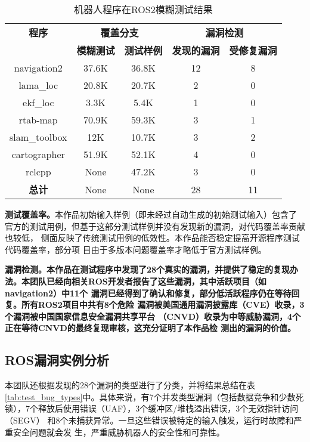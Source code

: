 \begin{table}[H]
	\small
	\caption{机器人程序在ROS2模糊测试结果}
  \label{tab:test_result}
	\centering
	\begin{tabular}{ccccc}
		\hline
		\textbf{程序} & \multicolumn{2}{c}{\textbf{覆盖分支}} & \multicolumn{2}{c}{\textbf{漏洞检测}} \\
		\cline{2-5}
		& \textbf{模糊测试} & \textbf{测试样例} & \textbf{发现的漏洞} & \textbf{受修复漏洞} \\
		\hline
		navigation2 & 37.6K & 36.8K & 12 & 8 \\
		lama\_loc & 20.8K & 20.7K & 2 & 0 \\
		ekf\_loc & 3.3K & 5.4K & 1 & 0 \\
		rtab-map & 70.9K & 59.3K & 3 & 1 \\
		slam\_toolbox & 12K & 10.7K & 3 & 2 \\
		cartographer & 51.9K & 52.1K & 4 & 0  \\
    rclcpp & None & 47.2K & 3 & 0 \\
		\textbf{总计} & None & None & 28 & 11 \\
		\hline
	\end{tabular}
\end{table}

\textbf{测试覆盖率。}本作品初始输入样例（即未经过自动生成的初始测试输入）包含了
官方的测试用例，但基于这部分测试样例并没有发现新的漏洞，对代码覆盖率贡献也较低，
侧面反映了传统测试用例的低效性。本作品能否稳定提高开源程序测试代码覆盖率，部分项
目由于多版本问题覆盖率才略低于官方测试样例。

\textbf{漏洞检测。本作品在测试程序中发现了28个真实的漏洞，并提供了稳定的复现办
法。本团队已经向相关ROS开发者报告了这些漏洞，其中活跃项目（如navigation2）中11个
漏洞已经得到了确认和修复，部分低活跃程序仍在等待回复。所有ROS2项目中共有8个危险
漏洞被美国通用漏洞披露库（CVE）收录，3个漏洞被中国国家信息安全漏洞共享平台
（CNVD）收录为中等威胁漏洞，4个正在等待CNVD的最终复现审核，这充分证明了本作品检
测出的漏洞的价值。}

\subsection{ROS漏洞实例分析}


本团队还根据发现的28个漏洞的类型进行了分类，并将结果总结在表
\ref{tab:test_bug_types}中。具体来说，有7个并发类型漏洞（包括数据竞争和少数死
锁），7个释放后使用错误（UAF），3个缓冲区/堆栈溢出错误，3个无效指针访问（SEGV）
和8个未捕获异常。一旦这些错误被特定的输入触发，运行时故障和严重安全问题就会发
生，严重威胁机器人的安全性和可靠性。

